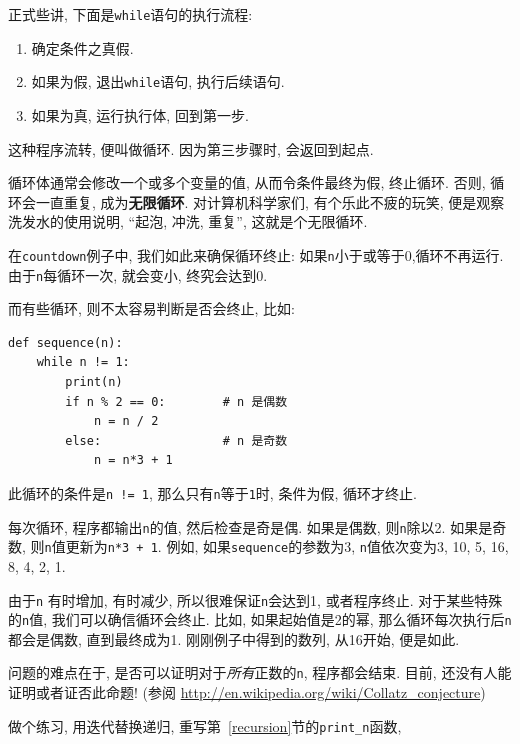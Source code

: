 \documentclass[10pt]{book}
\begin{document}
正式些讲, 下面是{\tt while}语句的执行流程:

\begin{enumerate}

\item 确定条件之真假.

\item 如果为假, 退出{\tt while}语句, 执行后续语句. 

\item 如果为真, 运行执行体, 回到第一步. 

\end{enumerate}

这种程序流转, 便叫做循环. 因为第三步骤时, 会返回到起点. 

循环体通常会修改一个或多个变量的值, 从而令条件最终为假, 终止循环. 
否则, 循环会一直重复, 成为{\bf 无限循环}. 
对计算机科学家们, 有个乐此不疲的玩笑, 
便是观察洗发水的使用说明, 
``起泡, 冲洗, 重复'',  这就是个无限循环. 

在{\tt countdown}例子中, 我们如此来确保循环终止:
如果{\tt n}小于或等于0,循环不再运行. 
由于{\tt n}每循环一次, 就会变小, 终究会达到0.

而有些循环, 则不太容易判断是否会终止, 比如:

\begin{verbatim}
def sequence(n):
    while n != 1:
        print(n)
        if n % 2 == 0:        # n 是偶数
            n = n / 2
        else:                 # n 是奇数
            n = n*3 + 1
\end{verbatim}
%
此循环的条件是{\tt n != 1},  那么只有{\tt n}等于{\tt 1}时, 条件为假, 循环才终止. 

每次循环, 程序都输出{\tt n}的值, 然后检查是奇是偶. 
如果是偶数, 则{\tt n}除以2. 如果是奇数, 则{\tt n}值更新为{\tt n*3 + 1}. 
例如, 如果{\tt sequence}的参数为3, {\tt n}值依次变为3, 10, 5, 16, 8, 4, 2, 1.


由于{\tt n} 有时增加, 有时减少, 所以很难保证{\tt n}会达到1, 或者程序终止. 
对于某些特殊的{\tt n}值, 我们可以确信循环会终止. 
比如, 如果起始值是2的幂, 那么循环每次执行后{\tt n}都会是偶数, 直到最终成为1.
刚刚例子中得到的数列, 从16开始, 便是如此. 

问题的难点在于, 是否可以证明对于{\em 所有}正数的{\tt n}, 程序都会结束. 
目前, 还没有人能证明或者证否此命题! 
(参阅 \url{http://en.wikipedia.org/wiki/Collatz_conjecture})

做个练习, 用迭代替换递归, 重写第~\ref{recursion}节的\verb"print_n"函数, 
\end{document}
